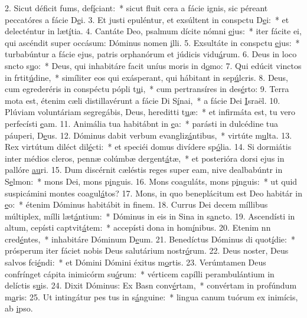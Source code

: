 2. Sicut déficit fums, def\uline{í}ciant:~* sicut fluit cera a fácie ignis, sic péreant peccatóres a fácie D\uline{e}i.
3. Et justi epuléntur, et exsúltent in conspctu D\uline{e}i:~* et delecténtur in læt\uline{í}tia.
4. Cantáte Deo, psalmum dícite nómni \uline{e}jus:~* iter fácite ei, qui ascéndit super occásum: Dóminus nomen \uline{i}lli.
5. Exsultáte in conspctu \uline{e}jus:~* turbabúntur a fácie ejus, patris orphanórum et júdicis vidu\uline{á}rum.
6. Deus in loco sncto s\uline{u}o:~* Deus, qui inhabitáre facit uníus moris in d\uline{o}mo:
7. Qui edúcit vinctos in frtit\uline{ú}dine,~* simíliter eos qui exásperant, qui hábitant in sep\uline{ú}lcris.
8. Deus, cum egrederéris in conspéctu pópli t\uline{u}i,~* cum pertransíres in des\uline{é}rto:
9. Terra mota est, étenim cæli distillavérunt a fácie Di S\uline{í}nai,~* a fácie Dei \uline{I}sraël.
10. Plúviam voluntáriam segregábis, Deus, hereditti t\uline{u}æ:~* et infirmáta est, tu vero perfecísti \uline{e}am.
11. Animália tua habitábnt in \uline{e}a:~* parásti in dulcédine tua páuperi, D\uline{e}us.
12. Dóminus dabit verbum evangliz\uline{á}ntibus,~* virtúte m\uline{u}lta.
13. Rex virtútum diléct dil\uline{é}cti:~* et speciéi domus divídere sp\uline{ó}lia.
14. Si dormiátis inter médios cleros, pennæ colúmbæ dergent\uline{á}tæ,~* et posterióra dorsi ejus in pallóre \uline{au}ri.
15. Dum discérnit cæléstis reges super eam, nive dealbabúntr in S\uline{e}lmon:~* mons Dei, mons p\uline{i}nguis.
16. Mons coaguláts, mons p\uline{i}nguis:~* ut quid suspicámini montes coagul\uline{á}tos?
17. Mons, in quo beneplácitum est Deo habitár in \uline{e}o:~* étenim Dóminus habitábit in f\uline{i}nem.
18. Currus Dei decem míllibus múltiplex, mílli læt\uline{á}ntium:~* Dóminus in eis in Sina in s\uline{a}ncto.
19. Ascendísti in altum, cepísti captvit\uline{á}tem:~* accepísti dona in hom\uline{í}nibus.
20. Etenim nn cred\uline{é}ntes,~* inhabitáre Dóminum D\uline{e}um.
21. Benedíctus Dóminus di quot\uline{í}die:~* prósperum iter fáciet nobis Deus salutárium nostr\uline{ó}rum.
22. Deus noster, Deus salvos fci\uline{é}ndi:~* et Dómini Dómini éxitus m\uline{o}rtis.
23. Verúmtamen Deus confrínget cápita inimicórm su\uline{ó}rum:~* vérticem capílli perambulántium in delíctis s\uline{u}is.
24. Dixit Dóminus: Ex Basn conv\uline{é}rtam,~* convértam in profúndum m\uline{a}ris:
25. Ut intingátur pes tus in s\uline{á}nguine:~* lingua canum tuórum ex inimícis, ab \uline{i}pso.
